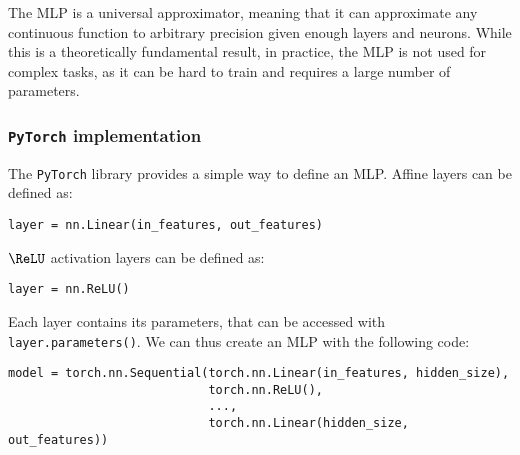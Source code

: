The MLP is a universal approximator, meaning that it can approximate any continuous function to arbitrary precision given enough layers and neurons. While this is a theoretically fundamental result, in practice, the MLP is not used for complex tasks, as it can be hard to train and requires a large number of parameters.

\subsubsection{\texttt{PyTorch} implementation}
The \texttt{PyTorch} library provides a simple way to define an MLP. Affine layers can be defined as:
\begin{center}
    \texttt{layer = nn.Linear(in_features, out_features)}
\end{center}
$\ReLU$ activation layers can be defined as:
\begin{center}
    \texttt{layer = nn.ReLU()}
\end{center}
Each layer contains its parameters, that can be accessed with \texttt{layer.parameters()}. We can thus create an MLP with the following code:
\begin{verbatim}
model = torch.nn.Sequential(torch.nn.Linear(in_features, hidden_size),
                            torch.nn.ReLU(),
                            ...,
                            torch.nn.Linear(hidden_size, out_features))
\end{verbatim}